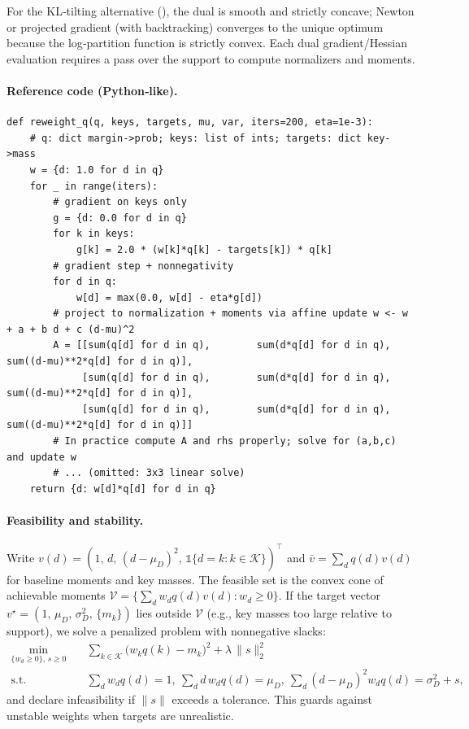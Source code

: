 For the KL‑tilting alternative (), the dual is smooth and strictly concave; Newton or projected gradient (with backtracking) converges to the unique optimum because the log‑partition function is strictly convex. Each dual gradient/Hessian evaluation requires a pass over the support to compute normalizers and moments.

\paragraph{Reference code (Python‑like).}
\begin{verbatim}
def reweight_q(q, keys, targets, mu, var, iters=200, eta=1e-3):
    # q: dict margin->prob; keys: list of ints; targets: dict key->mass
    w = {d: 1.0 for d in q}
    for _ in range(iters):
        # gradient on keys only
        g = {d: 0.0 for d in q}
        for k in keys:
            g[k] = 2.0 * (w[k]*q[k] - targets[k]) * q[k]
        # gradient step + nonnegativity
        for d in q:
            w[d] = max(0.0, w[d] - eta*g[d])
        # project to normalization + moments via affine update w <- w + a + b d + c (d-mu)^2
        A = [[sum(q[d] for d in q),        sum(d*q[d] for d in q),        sum((d-mu)**2*q[d] for d in q)],
             [sum(q[d] for d in q),        sum(d*q[d] for d in q),        sum((d-mu)**2*q[d] for d in q)],
             [sum(q[d] for d in q),        sum(d*q[d] for d in q),        sum((d-mu)**2*q[d] for d in q)]]
        # In practice compute A and rhs properly; solve for (a,b,c) and update w
        # ... (omitted: 3x3 linear solve)
    return {d: w[d]*q[d] for d in q}
\end{verbatim}

\paragraph{Feasibility and stability.}\label{subsec:key-feas}
Write $v(d)=(1,\,d,\,(d-\mu_D)^2,\,\mathbb{1}\{d=k: k\in\mathcal{K}\})^\top$ and $\bar v=\sum_d q(d) v(d)$ for baseline moments and key masses. The feasible set is the convex cone of achievable moments $\mathcal{V}=\{\sum_d w_d q(d) v(d): w_d\ge0\}$. If the target vector $v^\star=(1,\,\mu_D,\,\sigma_D^2,\,\{m_k\})$ lies outside $\mathcal{V}$ (e.g., key masses too large relative to support), we solve a penalized problem with nonnegative slacks:
\begin{align*}
\min_{\{w_d\ge0\},\,s\ge0}\quad & \sum_{k\in\mathcal{K}} \big(w_k q(k)-m_k\big)^2 + \lambda\,\|s\|_2^2\\
\text{s.t.}\quad & \sum_d w_d q(d)=1,\ \sum_d d\,w_d q(d)=\mu_D,\ \sum_d (d-\mu_D)^2 w_d q(d)=\sigma_D^2+s,
\end{align*}
and declare infeasibility if $\|s\|$ exceeds a tolerance. This guards against unstable weights when targets are unrealistic.

